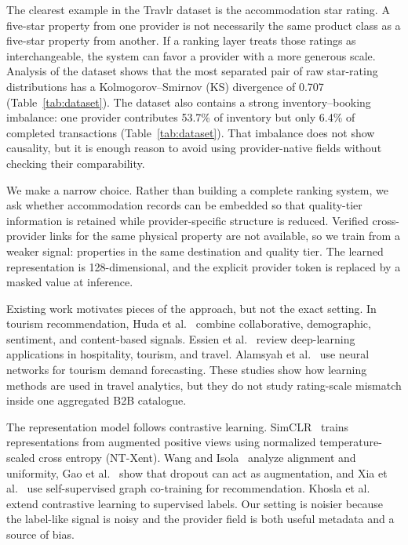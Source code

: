 \documentclass[conference,a4paper]{IEEEtran}
\begin{document}
The clearest example in the Travlr dataset is the accommodation star rating. A five-star property from one provider is not necessarily the same product class as a five-star property from another. If a ranking layer treats those ratings as interchangeable, the system can favor a provider with a more generous scale. Analysis of the dataset shows that the most separated pair of raw star-rating distributions has a Kolmogorov--Smirnov (KS) divergence of 0.707 (Table~\ref{tab:dataset}). The dataset also contains a strong inventory--booking imbalance: one provider contributes 53.7\% of inventory but only 6.4\% of completed transactions (Table~\ref{tab:dataset}). That imbalance does not show causality, but it is enough reason to avoid using provider-native fields without checking their comparability.

We make a narrow choice. Rather than building a complete ranking system, we ask whether accommodation records can be embedded so that quality-tier information is retained while provider-specific structure is reduced. Verified cross-provider links for the same physical property are not available, so we train from a weaker signal: properties in the same destination and quality tier. The learned representation is 128-dimensional, and the explicit provider token is replaced by a masked value at inference.

Existing work motivates pieces of the approach, but not the exact setting. In tourism recommendation, Huda et al.~\cite{huda2024smart} combine collaborative, demographic, sentiment, and content-based signals. Essien et al.~\cite{essien2023deep} review deep-learning applications in hospitality, tourism, and travel. Alamsyah et al.~\cite{alamsyah2019ann} use neural networks for tourism demand forecasting. These studies show how learning methods are used in travel analytics, but they do not study rating-scale mismatch inside one aggregated B2B catalogue.

The representation model follows contrastive learning. SimCLR~\cite{chen2020simclr} trains representations from augmented positive views using normalized temperature-scaled cross entropy (NT-Xent). Wang and Isola~\cite{wang2022understanding} analyze alignment and uniformity, Gao et al.~\cite{gao2021simcse} show that dropout can act as augmentation, and Xia et al.~\cite{yao2021self} use self-supervised graph co-training for recommendation. Khosla et al.~\cite{khosla2020supervised} extend contrastive learning to supervised labels. Our setting is noisier because the label-like signal is noisy and the provider field is both useful metadata and a source of bias.
\end{document}

